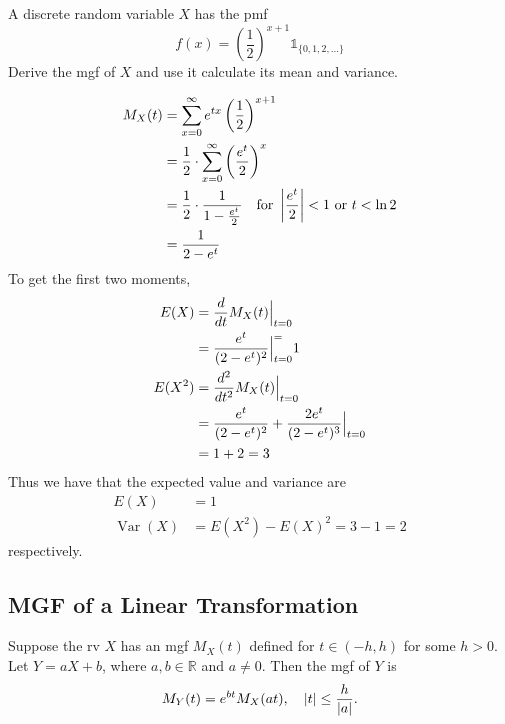 \documentclass[notoc,notitlepage]{tufte-book}
\DeclareMathOperator{\Var}{Var }
\begin{document}
\begin{eg}[Example 2.27]
  A discrete random variable $X$ has the pmf
  \begin{equation*}
    f(x) = \left( \frac{1}{2} \right)^{x + 1} \mathbb{1}_{\{0, 1, 2, ...\}}
  \end{equation*}
  Derive the mgf of $X$ and use it calculate its mean and variance.

  \begin{align*}
    M_X(t) &= \sum_{x = 0}^{\infty} e^{tx} \left( \frac{1}{2} \right)^{x + 1} \\
           &= \frac{1}{2} \cdot \sum_{x = 0}^{\infty} \left( \frac{e^t}{2} \right)^x \\
           &= \frac{1}{2} \cdot \frac{1}{1 - \frac{e^t}{2}} \quad \text{for } \left|\frac{e^t}{2}\right| < 1 \text{ or } t < \ln 2 \\
           &= \frac{1}{2 - e^t}
  \end{align*}
  To get the first two moments,
  \begin{align*}
    E(X) &= \frac{d}{dt} M_X(t) \Big|_{t = 0}^{} \\
      &= \frac{e^t}{( 2 - e^t )^2} \Big|_{t = 0}^{=} 1 \\
    E(X^2) &= \frac{d^2}{dt^2} M_X(t) \Big|_{t = 0}^{} \\
      &= \frac{e^t}{(2 - e^t)^2} + \frac{2e^t}{(2 - e^t)^3} \Big|_{t = 0}^{} \\
      &= 1 + 2 = 3
  \end{align*}
  Thus we have that the expected value and variance are
  \begin{align*}
    E(X) &= 1 \\
    \Var(X) &= E(X^2) - E(X)^2 = 3 - 1 = 2
  \end{align*}
  respectively.
\end{eg}

\subsection{MGF of a Linear Transformation}
\label{sub:mgf_of_a_linear_transformation}

\begin{thm}
\label{thm:mgf_of_a_linear_transformation}
  Suppose the rv $X$ has an mgf $M_X(t)$ defined for $t \in (-h, h)$ for some $h > 0$. Let $Y = aX + b$, where $a, b \in \mathbb{R}$ and $a \neq 0$. Then the mgf of $Y$ is
  \begin{equation}\label{eq:mgf_of_a_linear_transformation}
    M_Y(t) = e^{bt} M_X(at), \quad \left|t\right| \leq \frac{h}{\left|a\right|}.
  \end{equation}
\end{thm}
\end{document}
